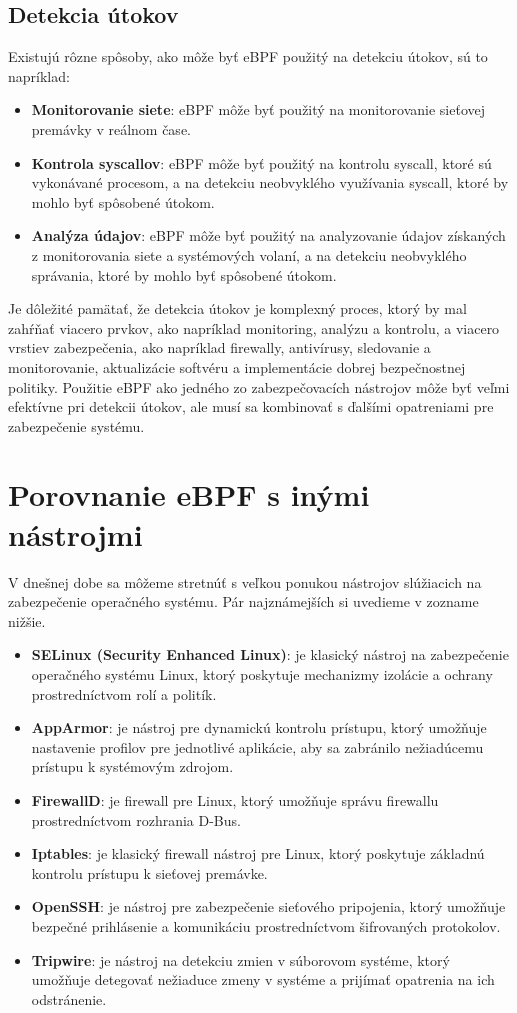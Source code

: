 \subsection{Detekcia útokov}
Existujú rôzne spôsoby, ako môže byť eBPF použitý na detekciu útokov, sú to napríklad:
\begin{itemize}
    \item \textbf{Monitorovanie siete}: eBPF môže byť použitý na monitorovanie sieťovej premávky v reálnom čase.
    \item \textbf{Kontrola syscallov}: eBPF môže byť použitý na kontrolu syscall, ktoré sú vykonávané procesom, a na detekciu neobvyklého využívania syscall, 
    ktoré by mohlo byť spôsobené útokom.
    \item \textbf{Analýza údajov}: eBPF môže byť použitý na analyzovanie údajov získaných z monitorovania siete a systémových volaní, a na detekciu 
    neobvyklého správania, ktoré by mohlo byť spôsobené útokom.    
\end{itemize}
Je dôležité pamätať, že detekcia útokov je komplexný proces, ktorý by mal zahŕňať viacero prvkov, ako napríklad monitoring, analýzu a kontrolu, 
a viacero vrstiev zabezpečenia, ako napríklad firewally, antivírusy, sledovanie a monitorovanie, aktualizácie softvéru a implementácie dobrej 
bezpečnostnej politiky. Použitie eBPF ako jedného zo zabezpečovacích nástrojov môže byť veľmi efektívne pri detekcii útokov, ale musí 
sa kombinovať s ďalšími opatreniami pre zabezpečenie systému.

\section{Porovnanie eBPF s inými nástrojmi} 
V dnešnej dobe sa môžeme stretnúť s veľkou ponukou nástrojov slúžiacich na zabezpečenie operačného systému. 
Pár najznámejších si uvedieme v zozname nižšie.  
\begin{itemize}
    \item \textbf{SELinux (Security Enhanced Linux)}: je klasický nástroj na zabezpečenie operačného systému Linux, ktorý poskytuje mechanizmy 
    izolácie a ochrany prostredníctvom rolí a politík.
    \item \textbf{AppArmor}: je nástroj pre dynamickú kontrolu prístupu, ktorý umožňuje nastavenie profilov pre jednotlivé aplikácie, 
    aby sa zabránilo nežiadúcemu prístupu k systémovým zdrojom.
    \item \textbf{FirewallD}: je firewall pre Linux, ktorý umožňuje správu firewallu prostredníctvom rozhrania D-Bus.
    \item \textbf{Iptables}: je klasický firewall nástroj pre Linux, ktorý poskytuje základnú kontrolu prístupu k sieťovej premávke.
    \item \textbf{OpenSSH}: je nástroj pre zabezpečenie sieťového pripojenia, ktorý umožňuje bezpečné prihlásenie a komunikáciu prostredníctvom šifrovaných protokolov.
    \item \textbf{Tripwire}: je nástroj na detekciu zmien v súborovom systéme, ktorý umožňuje detegovať nežiaduce zmeny v systéme a prijímať opatrenia na ich odstránenie.
\end{itemize}

